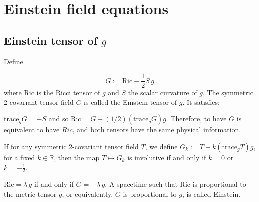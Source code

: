 \chapter{Einstein field equations}

\section{Einstein tensor of $g$}

Define

$$G:=\mathrm{Ric}-\frac{1}{2}S\,g$$where Ric
is the Ricci tensor of $g$ and $S$ the scalar curvature of $g$.
The symmetric 2-covariant tensor field $G$ is called the
Einstein tensor of $g$. It satisfies:

\vspace{3mm}

 $\mathrm{trace}_gG=-S$ and
so $\mathrm{Ric}=G-(1/2)(\mathrm{trace}_gG)g$. Therefore, to have
$G$ is equivalent to have $Ric$, and both tensors have the same
physical information.

\vspace{3mm}

 If for any symmetric
2-covariant tensor field $T$, we define
$G_k:=T+k(\mathrm{trace}_gT)g$, for a fixed $k\in \mathbb{R}$,
then the map $T \longmapsto G_k$ is involutive if and only if
$k=0$ or $k=-\frac{1}{2}$.

\vspace{3mm}

 $\mathrm{Ric}=\lambda\,g$ if and only if
$G=-\lambda\,g$. A spacetime such that Ric is proportional to the
metric tensor $g$, or equivalently, $G$ is proportional to $g$, is
called Einstein.